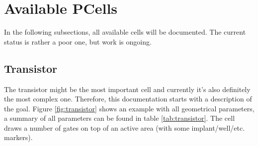 \section{Available PCells}
In the following subsections, all available cells will be documented. The current status is rather a poor one, but work is ongoing.
\subsection{Transistor}
The transistor might be the most important cell and currently it's also definitely the most complex one. Therefore, this documentation starts with a description of
the goal. Figure \ref{fig:transistor} shows an example with all geometrical parameters, a summary of all parameters can be found in table \ref{tab:transistor}. The
cell draws a number of gates on top of an active area (with some implant/well/etc. markers).
